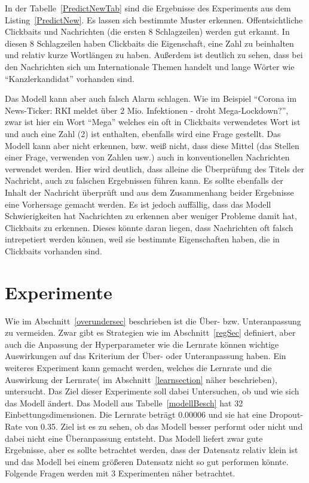In der Tabelle~\ref{PredictNewTab} sind die Ergebnisse des Experiments aus dem Listing~\ref{PredictNew}. Es lassen sich bestimmte Muster erkennen. Offentsichtliche Clickbaits und Nachrichten (die ersten 8 Schlagzeilen) werden gut erkannt. In diesen 8 Schlagzeilen haben Clickbaits die Eigenschaft, eine Zahl zu beinhalten und relativ kurze Wortlängen zu haben. Außerdem ist deutlich zu sehen, dass bei den Nachrichten sich um Internationale Themen handelt und lange Wörter wie \enquote{Kanzlerkandidat} vorhanden sind.

Das Modell kann aber auch falsch Alarm schlagen. Wie im Beispiel \enquote{Corona im News-Ticker: RKI meldet über 2 Mio. Infektionen - droht Mega-Lockdown?}, zwar ist hier ein Wort \enquote{Mega} welches ein oft in Clickbaits verwendetes Wort ist und auch eine Zahl (2) ist enthalten, ebenfalls wird eine Frage gestellt. Das Modell kann aber nicht erkennen, bzw. weiß nicht, dass diese Mittel (das Stellen einer Frage, verwenden von Zahlen usw.) auch in konventionellen Nachrichten verwendet werden. Hier wird deutlich, dass alleine die Überprüfung des Titels der Nachricht, auch zu falschen Ergebnissen führen kann. Es sollte ebenfalls der Inhalt der Nachricht überprüft und aus dem Zusammenhang beider Ergebnisse eine Vorhersage gemacht werden. Es ist jedoch auffällig, dass das Modell Schwierigkeiten hat Nachrichten zu erkennen aber weniger Probleme damit hat, Clickbaits zu erkennen. Dieses könnte daran liegen, dass Nachrichten oft falsch intrepetiert werden können, weil sie bestimmte Eigenschaften haben, die in Clickbaits vorhanden sind.

\section{Experimente}

Wie im Abschnitt~\ref{overundersec} beschrieben ist die Über- bzw. Unteranpassung zu vermeiden. Zwar gibt es Strategien wie im Abschnitt~\ref{regSec} definiert, aber auch die Anpassung der Hyperparameter wie die Lernrate können wichtige Auswirkungen auf das Kriterium der Über- oder Unteranpassung haben. Ein weiteres Experiment kann gemacht werden, welches die Lernrate und die Auswirkung der Lernrate( im Abschnitt~\ref{learnsection} näher beschrieben), untersucht. Das Ziel dieser Experimente soll dabei Untersuchen, ob und wie sich das Modell ändert. Das Modell aus Tabelle~\ref{modellBesch} hat 32 Einbettungsdimensionen. Die Lernrate beträgt 0.00006 und sie hat eine Dropout-Rate von 0.35. Ziel ist es zu sehen, ob das Modell besser performt oder nicht und dabei nicht eine Überanpassung entsteht. Das Modell liefert zwar gute Ergebnisse, aber es sollte betrachtet werden, dass der Datensatz relativ klein ist und das Modell bei einem größeren Datensatz nicht so gut performen könnte. Folgende Fragen werden mit 3 Experimenten näher betrachtet.

